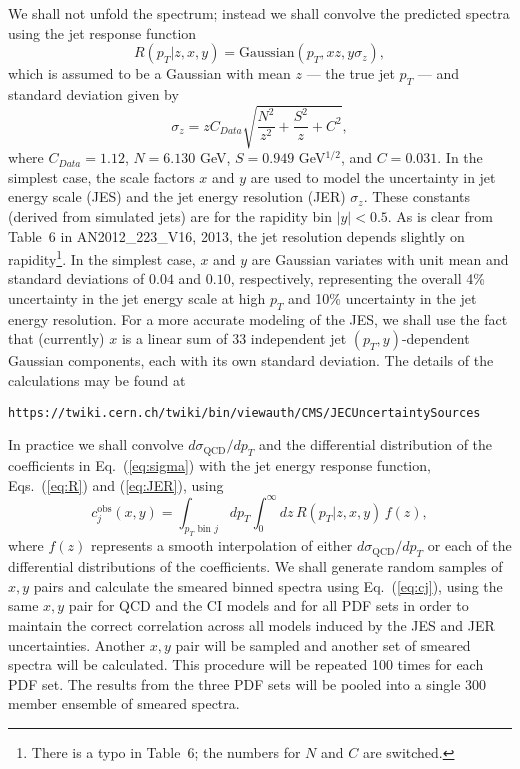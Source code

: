 \documentclass[aps,prd,preprint,nofootinbib]{revtex4}
\begin{document}
We shall not unfold the spectrum; instead we shall convolve the predicted spectra using
the jet response function 
\begin{equation}
R(p_T| z, x, y) = \text{Gaussian}(p_T, x z, y \sigma_z),
\label{eq:R}
\end{equation}
which is assumed to be a Gaussian with mean $z$ --- the true jet $p_T$ --- and standard deviation 
 given by 
\begin{equation}
	\sigma_z = z C_{Data} \sqrt{\frac{N^2}{z^2} + \frac{S^2}{z} + C^2}, 
	\label{eq:JER}
\end{equation}
where $C_{Data} = 1.12$, $N = 6.130$ GeV, $S = 0.949$ GeV$^{1/2}$, and
$C = 0.031$. In the simplest case, the scale factors $x$ and $y$ are used to model 
the uncertainty in
jet energy scale (JES) and the jet energy resolution (JER) $\sigma_z$. These constants
(derived from simulated jets) are for the rapidity bin $|y| < 0.5$.  As is clear from Table~6 in
AN2012\_223\_V16, 2013, the jet  resolution depends slightly on rapidity\footnote{There is a typo in Table~6; the numbers for $N$ and $C$ are switched.}.
In
the simplest case, $x$ and $y$ are Gaussian variates with unit mean and standard
deviations of $0.04$ and $0.10$, respectively, representing the overall 4\% uncertainty in the
jet energy scale at high $p_T$ and 10\% uncertainty in the jet energy resolution.
For a more accurate modeling of the JES, we shall use the fact that (currently) $x$ is
a linear sum of 33 independent jet $(p_T, y)$-dependent Gaussian components, each with
its own standard deviation. The details of the calculations may be found at

{\tt https://twiki.cern.ch/twiki/bin/viewauth/CMS/JECUncertaintySources}
 
In practice we shall convolve $d\sigma_\text{QCD}/dp_T$ and the differential
distribution of the coefficients  in Eq.~(\ref{eq:sigma})  with the jet energy response function, Eqs.~(\ref{eq:R}) and (\ref{eq:JER}), using
\begin{equation}
	c_j^\text{obs}(x, y) = \int_\text{$p_T$ bin $j$} dp_T \int_0^\infty dz \,  R(p_T | z, x, y) \, f(z),
	\label{eq:cj}
\end{equation}
where $f(z)$ represents a smooth interpolation of either $d\sigma_\text{QCD}/dp_T$ or each of the differential distributions of the coefficients. We shall generate random samples of $x, y$
pairs and calculate the smeared binned spectra using Eq.~(\ref{eq:cj}), using the same
$x, y$ pair for QCD and the CI models and for all PDF sets in order to maintain the correct
correlation across all models induced by the JES and JER uncertainties. Another $x, y$ pair
will be sampled and another set of smeared spectra will be calculated. This procedure
will be repeated 100 times for each PDF
set. The results from the three PDF sets will be pooled into a single 300 member ensemble of
smeared spectra. 
\end{document}
